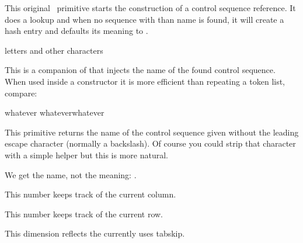 \stopnewprimitive

\startoldprimitive[title={\prm {csname}}]

This original \TEX\ primitive starts the construction of a control sequence
reference. It does a lookup and when no sequence with than name is found, it will
create a hash entry and defaults its meaning to .

\starttyping
\csname letters and other characters\endcsname
\stoptyping

\stopoldprimitive

\startnewprimitive[title={\prm {csnamestring}}]

This is a companion of  that injects the name of the found
control sequence. When used inside a  constructor it is more
efficient than repeating a token list, compare:

\starttyping
\csname\ifcsname whatever\endcsname\csnamestring\endcsname %
\csname\ifcsname whatever\endcsname     whatever\endcsname %
\stoptyping

\stopnewprimitive

\startnewprimitive[title={\prm {csstring}}]

This primitive returns the name of the control sequence given without the leading
escape character (normally a backslash). Of course you could strip that character
with a simple helper but this is more natural.

\startbuffer
\csstring\mymacro
\stopbuffer

\typebuffer

We get the name, not the meaning: {\tt \inlinebuffer}.

\stopnewprimitive

\startnewprimitive[title={\prm {currentalignmentcolumn}}]

This number keeps track of the current column.

\stopnewprimitive

\startnewprimitive[title={\prm {currentalignmentrow}}]

This number keeps track of the current row.

\stopnewprimitive

\startnewprimitive[title={\prm {currentalignmenttabskip}}]

This dimension reflects the currently uses tabskip.

\stopnewprimitive

\startoldprimitive[title={\prm {currentgrouplevel}}]

